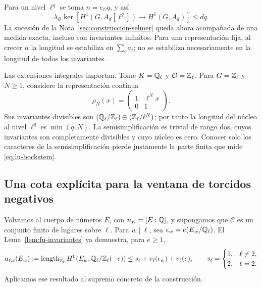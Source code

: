 Para un nivel $\ell^q$ se toma $n=e_{\mathcal O}q$, y así
\begin{equation}
 \lambda_{\mathcal O}\ker\!\left[
 H^1(G,A_d[\ell^q])\to H^1(G,A_d)\right]\le dq.
 \label{eq:lu-bockstein-normalizado}
\end{equation}
La sucesión de la Nota~\ref{sec:construccion-selmer} queda ahora
acompañada de una medida exacta, incluso con invariantes infinitos.
Para una representación fija, al crecer $n$ la longitud se
estabiliza en $\sum_i a_i$; no se estabiliza necesariamente en
la longitud de todos los invariantes.

Las extensiones integrales importan. Tome $K=\mathbb{Q}_\ell$ y
$\mathcal O=\mathbb{Z}_\ell$. Para $G=\mathbb{Z}_\ell$ y $N\ge1$,
considere la representación continua
\begin{equation}
 \rho_N(x)=\begin{pmatrix}1&\ell^N x\\0&1\end{pmatrix}.
 \label{eq:lu-unipotente}
\end{equation}
Sus invariantes divisibles son
$(\mathbb{Q}_\ell/\mathbb{Z}_\ell)\oplus(\mathbb{Z}_\ell/\ell^N)$; por tanto la
longitud del núcleo al nivel $\ell^q$ es $\min(q,N)$.
La semisimplificación es trivial de rango dos, cuyos invariantes
son completamente divisibles y cuyo núcleo es cero.
Conocer solo los caracteres de la semisimplificación pierde
justamente la parte finita que mide \eqref{eq:lu-bockstein}.

\subsection{Una cota explícita para la ventana de torcidos negativos}
\label{subsec:lu-h0-caracteres}

Volvamos al cuerpo de números $E$, con $n_E=[E:\mathbb{Q}]$, y supongamos
que $\mathcal C$ es un conjunto finito de lugares sobre $\ell$.
Para $w\mid\ell$, sea $\epsilon_w=e(E_w/\mathbb{Q}_\ell)$. El
Lema~\ref{lem:fu-invariantes} ya demuestra, para $e\ge1$,
\begin{equation}
 a_{\ell,e}(E_w):=\operatorname{length}_{\mathbb{Z}_\ell}
 H^0(E_w,\mathbb{Q}_\ell/\mathbb{Z}_\ell(-e))
 \le s_\ell+v_\ell(\epsilon_w)+v_\ell(e),\qquad
 s_\ell=\begin{cases}1,&\ell\ne2,\\2,&\ell=2.\end{cases}
 \label{eq:lu-ciclotomica-previa}
\end{equation}
Aplicamos ese resultado al supremo concreto de la construcción.

